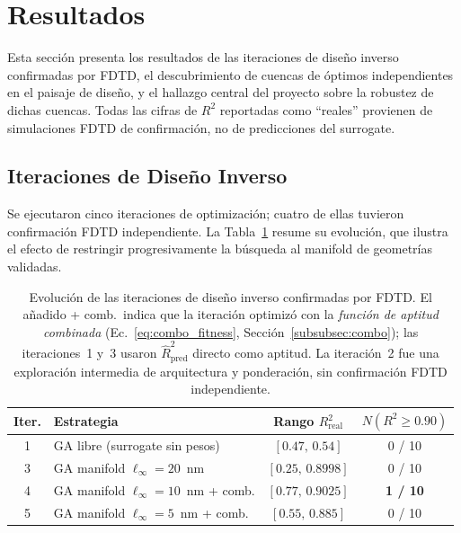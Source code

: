 \section{Resultados}\label{sec:resultados}

Esta sección presenta los resultados de las iteraciones de diseño inverso confirmadas por FDTD, el descubrimiento de cuencas de óptimos independientes en el paisaje de diseño, y el hallazgo central del proyecto sobre la robustez de dichas cuencas. Todas las cifras de $R^2$ reportadas como ``reales'' provienen de simulaciones FDTD de confirmación, no de predicciones del surrogate.

\subsection{Iteraciones de Diseño Inverso}\label{subsec:iteraciones}

Se ejecutaron cinco iteraciones de optimización; cuatro de ellas tuvieron confirmación FDTD independiente. La Tabla~\ref{tab:iteraciones} resume su evolución, que ilustra el efecto de restringir progresivamente la búsqueda al manifold de geometrías validadas.

\begin{table}[H]
\centering
\small
\begin{tabular}{clcc}
\toprule
\textbf{Iter.} & \textbf{Estrategia} & \textbf{Rango $R^2_{\text{real}}$} & \textbf{$N(R^2\geq 0.90)$} \\
\midrule
1 & GA libre (surrogate sin pesos)        & $[0.47,\,0.54]$   & 0 / 10 \\
3 & GA manifold $\ell_\infty = 20$~nm     & $[0.25,\,0.8998]$ & 0 / 10 \\
4 & GA manifold $\ell_\infty = 10$~nm + comb. & $[0.77,\,0.9025]$ & \textbf{1 / 10} \\
5 & GA manifold $\ell_\infty = 5$~nm + comb.  & $[0.55,\,0.885]$  & 0 / 10 \\
\bottomrule
\end{tabular}
\caption{Evolución de las iteraciones de diseño inverso confirmadas por FDTD. El añadido + comb.\ indica que la iteración optimizó con la \emph{función de aptitud combinada} (Ec.~\ref{eq:combo_fitness}, Sección~\ref{subsubsec:combo}); las iteraciones~1 y~3 usaron $\hat{R}^2_{\text{pred}}$ directo como aptitud. La iteración~2 fue una exploración intermedia de arquitectura y ponderación, sin confirmación FDTD independiente.}
\label{tab:iteraciones}
\end{table}

